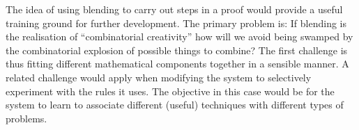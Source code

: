 The idea of using blending to carry out steps in a proof would provide
a useful training ground for further development.  The primary problem
is: If blending is the realisation of ``combinatorial creativity'' how
will we avoid being swamped by the combinatorial explosion of possible
things to combine?  The first challenge is thus fitting different
mathematical components together in a sensible manner.  A related
challenge would apply when modifying the system to selectively
experiment with the rules it uses.  The objective in this case would
be for the system to learn to associate different (useful) techniques
with different types of problems.

